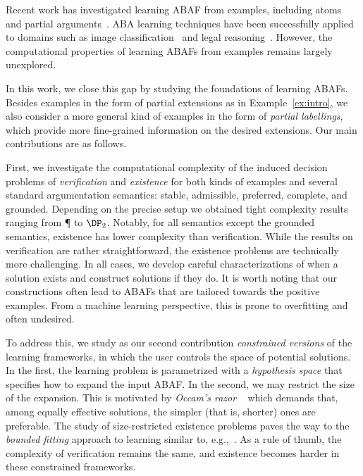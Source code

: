\documentclass[letterpaper]{article} %
\begin{document}
Recent work has investigated learning ABAF from examples, including atoms~\cite{ProiettiT22} and partial arguments~\cite{PopescuW25}.
ABA learning techniques have been successfully applied to domains such as image classification~\cite{JacobKAGPT25} and legal reasoning~\cite{AngelisPT25,VasileiadisAPT25}.
However, the computational properties of learning ABAFs from examples remains largely unexplored.

In this work, we close this gap by studying the foundations of learning ABAFs. Besides examples in the form of partial extensions as in Example~\ref{ex:intro}, we also consider a more general kind of examples in the form of \emph{partial labellings}, which provide more fine-grained information on the desired extensions. Our main contributions are as follows. 

First, we investigate the computational complexity of the induced decision problems of \emph{verification} and \emph{existence} for both kinds of examples and several standard argumentation semantics: stable, admissible, preferred, complete, and grounded. Depending on the precise setup we obtained tight complexity results ranging from \P{} to $\DP_2$.  Notably, for all semantics except the grounded semantics, existence has lower complexity than verification. 
While the results on verification are rather straightforward, the existence problems are technically more challenging. In all cases, we develop careful characterizations of when a solution exists and construct solutions if they do. It is worth noting that our constructions often lead to ABAFs that are tailored towards the positive examples. From a machine learning perspective, this is prone to overfitting and often undesired. 

To address this, we study as our second contribution \emph{constrained versions} of the learning frameworks, in which the user controls the space of potential solutions. In the first, the learning problem is parametrized with a \emph{hypothesis space} that specifies how to expand the input ABAF. In the second, we may restrict the size of the expansion. This is motivated by \emph{Occam's razor} ~\cite{DBLP:journals/ipl/BlumerEHW87} which demands that, among equally effective solutions, the simpler (that is, shorter) ones are preferable. The study of size-restricted existence problems paves the way to the \emph{bounded fitting} approach to learning similar to, e.g.,~\cite{DBLP:conf/ijcai/CateFJL23}. As a rule of thumb, the complexity of verification remains the same, and existence becomes harder in these constrained frameworks.
\end{document}
